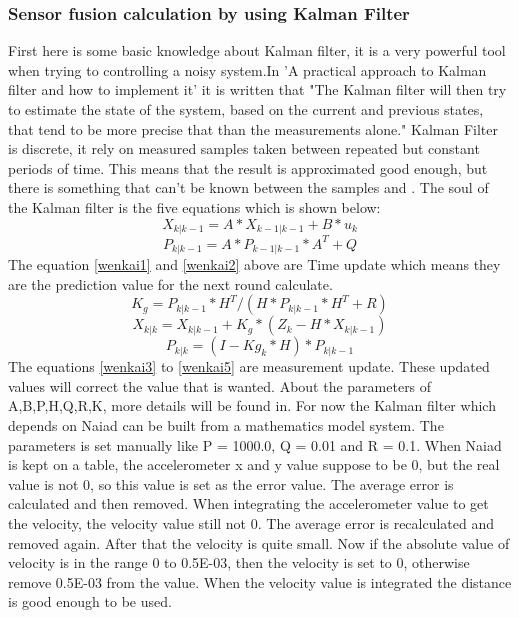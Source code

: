 		\subsubsection*{Sensor fusion calculation by using Kalman Filter}
		\noindent
		First here is some basic knowledge about Kalman filter, it is a very powerful tool when trying to controlling a noisy system\cite{kalman_filter}.In 'A practical approach to Kalman filter and how to implement it' it is written that "The Kalman filter will then try to estimate the state of the system, based on the current and previous states, that tend to be more precise that than the measurements alone."\cite{TKJ} Kalman Filter is discrete, it rely on measured samples taken between repeated but constant periods of time. This means that the result is approximated good enough, but there is something that can't be known between the samples\cite{Greg_Czerniaks_Website} and \cite{change_parameter}. The soul of the Kalman filter is the five equations which is shown below:
\begin{equation}
\label{wenkai1}
	X_{k|k-1} = A*X_{k-1|k-1} +B*u_{k}
\end{equation}
\begin{equation}
\label{wenkai2}
	P_{k|k-1} = A*P_{k-1|k-1}*A^{T} + Q
\end{equation}
The equation \ref{wenkai1} and \ref{wenkai2} above are Time update which means they are the prediction value for the next round calculate.
\begin{equation}
\label{wenkai3}
K_{g} = P_{k|k-1}*H^{T}/(H*P_{k|k-1}*H^{T}+R)
\end{equation}
\begin{equation}
\label{wenkai4}
	X_{k|k} = X_{k|k-1} +K_{g}*(Z_{k}-H*X_{k|k-1})
\end{equation}
\begin{equation}
\label{wenkai5}
P_{k|k}=(I-Kg_{k}* H)*P_{k|k-1}
\end{equation}
 The equations \ref{wenkai3} to \ref{wenkai5} are measurement update. These updated values will correct the value that is wanted\cite{kalman_filter_dummies}. About the parameters of A,B,P,H,Q,R,K, more details will be found in\cite{parameter}.
 For now the Kalman filter which depends on Naiad can be built from a mathematics model system. The parameters is set manually like P = 1000.0, Q = 0.01 and R = 0.1. When Naiad is kept on a table, the accelerometer x and y value suppose to be 0, but the real value is not 0, so this value is set as the error value. The average error is calculated and then removed. When integrating the accelerometer value to get the velocity, the velocity value still not 0. The average error is recalculated and removed again. After that the velocity is quite small. Now if the absolute value of velocity is in the range 0 to 0.5E-03, then the velocity is set to 0, otherwise remove 0.5E-03 from the value. When the velocity value is integrated the distance is good enough to be used.

